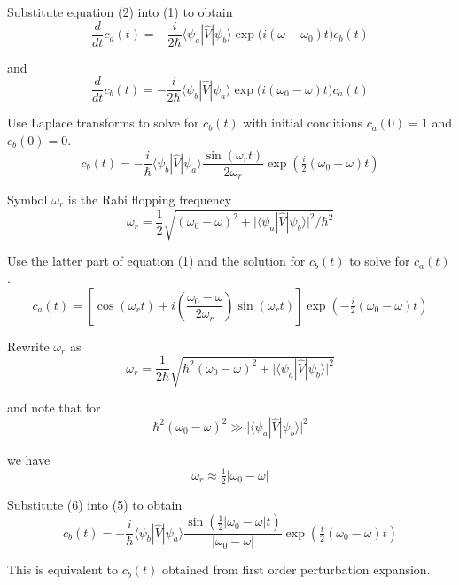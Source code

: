 Substitute equation (2) into (1) to obtain
\begin{equation*}
\frac{d}{dt}c_a(t)=-\frac{i}{2\hbar}\langle\psi_a|\hat V|\psi_b\rangle
\exp\bigl(i(\omega-\omega_0)t\bigr)c_b(t)
\tag{3}
\end{equation*}

and
\begin{equation*}
\frac{d}{dt}c_b(t)=-\frac{i}{2\hbar}\langle\psi_b|\hat V|\psi_a\rangle
\exp\bigl(i(\omega_0-\omega)t\bigr)c_a(t)
\tag{4}
\end{equation*}

Use Laplace transforms to solve for $c_b(t)$ with initial conditions $c_a(0)=1$ and $c_b(0)=0$.
\begin{equation*}
c_b(t)=-\frac{i}{\hbar}\langle\psi_b|\hat V|\psi_a\rangle
\frac{\sin(\omega_rt)}{2\omega_r}
\exp\left(\tfrac{i}{2}(\omega_0-\omega)t\right)
\tag{5}
\end{equation*}

Symbol $\omega_r$ is the Rabi flopping frequency
\begin{equation*}
\omega_r=\frac{1}{2}\sqrt{(\omega_0-\omega)^2
+\bigl|\langle\psi_a|\hat V|\psi_b\rangle\bigr|^2/\hbar^2}
\end{equation*}

Use the latter part of equation (1) and the solution for $c_b(t)$ to solve for $c_a(t)$.
\begin{equation*}
c_a(t)=\left[\cos(\omega_rt)+i\left(\frac{\omega_0-\omega}{2\omega_r}\right)\sin(\omega_rt)\right]
\exp\left(-\tfrac{i}{2}(\omega_0-\omega)t\right)
\end{equation*}

Rewrite $\omega_r$ as
\begin{equation*}
\omega_r=\frac{1}{2\hbar}\sqrt{\hbar^2(\omega_0-\omega)^2
+\bigl|\langle\psi_a|\hat V|\psi_b\rangle\bigr|^2}
\end{equation*}

and note that for
\begin{equation*}
\hbar^2(\omega_0-\omega)^2\gg\bigl|\langle\psi_a|\hat V|\psi_b\rangle\bigr|^2
\end{equation*}

we have
\begin{equation*}
\omega_r\approx\tfrac{1}{2}|\omega_0-\omega|
\tag{6}
\end{equation*}

Substitute (6) into (5) to obtain
\begin{equation*}
c_b(t)=-\frac{i}{\hbar}\langle\psi_b|\hat V|\psi_a\rangle
\frac{\sin\left(\tfrac{1}{2}|\omega_0-\omega|t\right)}{|\omega_0-\omega|}
\exp\left(\tfrac{i}{2}(\omega_0-\omega)t\right)
\end{equation*}

This is equivalent to $c_b(t)$ obtained from first order perturbation expansion.


